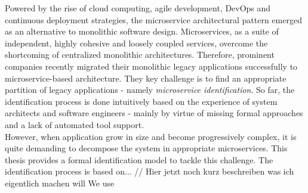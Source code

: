 

\Abstract
Powered by the rise of cloud computing, agile development, DevOps and continuous deployment strategies, the microservice architectural pattern emerged as an alternative to monolithic software design. Microservices, as a suite of independent, highly cohesive and loosely coupled services, overcome the shortcoming of centralized monolithic architectures. Therefore, prominent companies recently migrated their monolithic legacy applications successfully to microservice-based architecture. They key challenge is to find an appropriate partition of legacy applications - namely \textit{microservice identification}. So far, the identification process is done intuitively based on the experience of system architects and software engineers - mainly by virtue of missing formal approaches and a lack of automated tool support. \\
However, when application grow in size and become progressively complex, it is quite demanding to decompose the system in appropriate microservices.
This thesis provides a formal identification model to tackle this challenge. The identification process is based on... // Hier jetzt noch kurz beschreiben was ich eigentlich machen will
We use 




